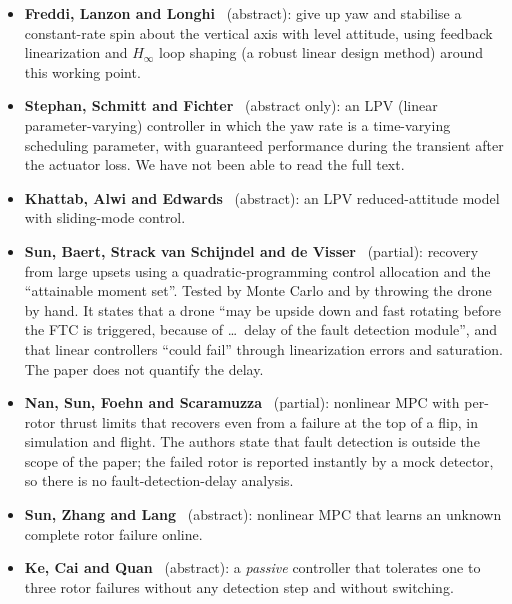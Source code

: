 \begin{itemize}
  \item \textbf{Freddi, Lanzon and Longhi}~\cite{freddi2011feedback,lanzon2014flight} (abstract): give up yaw and stabilise a constant-rate spin about the vertical axis with level attitude, using feedback linearization and $H_\infty$ loop shaping (a robust linear design method) around this working point.
  \item \textbf{Stephan, Schmitt and Fichter}~\cite{stephan2018lpv} (abstract only): an LPV (linear parameter-varying) controller in which the yaw rate is a time-varying scheduling parameter, with guaranteed performance during the transient after the actuator loss. We have not been able to read the full text.
  \item \textbf{Khattab, Alwi and Edwards}~\cite{khattab2019lpv} (abstract): an LPV reduced-attitude model with sliding-mode control.
  \item \textbf{Sun, Baert, Strack van Schijndel and de Visser}~\cite{sun2020upset} (partial): recovery from large upsets using a quadratic-programming control allocation and the ``attainable moment set''. Tested by Monte Carlo and by throwing the drone by hand. It states that a drone ``may be upside down and fast rotating before the FTC is triggered, because of \ldots\ delay of the fault detection module'', and that linear controllers ``could fail'' through linearization errors and saturation. The paper does not quantify the delay.
  \item \textbf{Nan, Sun, Foehn and Scaramuzza}~\cite{nan2022nmpc} (partial): nonlinear MPC with per-rotor thrust limits that recovers even from a failure at the top of a flip, in simulation and flight. The authors state that fault detection is outside the scope of the paper; the failed rotor is reported instantly by a mock detector, so there is no fault-detection-delay analysis.
  \item \textbf{Sun, Zhang and Lang}~\cite{sun2022ftmpc} (abstract): nonlinear MPC that learns an unknown complete rotor failure online.
  \item \textbf{Ke, Cai and Quan}~\cite{ke2023uniform} (abstract): a \emph{passive} controller that tolerates one to three rotor failures without any detection step and without switching.
\end{itemize}

